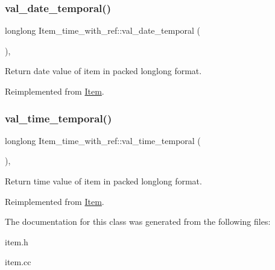 \subsubsection{\texorpdfstring{val\+\_\+date\+\_\+temporal()}{val\_date\_temporal()}}
{\footnotesize\ttfamily longlong Item\+\_\+time\+\_\+with\+\_\+ref\+::val\+\_\+date\+\_\+temporal (\begin{DoxyParamCaption}{ }\end{DoxyParamCaption})\hspace{0.3cm}{\ttfamily [inline]}, {\ttfamily [virtual]}}

Return date value of item in packed longlong format. 

Reimplemented from \mbox{\hyperlink{classItem_a9174217a46706eb2db74689b5365c4a5}{Item}}.

\mbox{\label{classItem__time__with__ref_a9e41e41a7136e706ac9182203ea3063f}} 
\subsubsection{\texorpdfstring{val\+\_\+time\+\_\+temporal()}{val\_time\_temporal()}}
{\footnotesize\ttfamily longlong Item\+\_\+time\+\_\+with\+\_\+ref\+::val\+\_\+time\+\_\+temporal (\begin{DoxyParamCaption}{ }\end{DoxyParamCaption})\hspace{0.3cm}{\ttfamily [inline]}, {\ttfamily [virtual]}}

Return time value of item in packed longlong format. 

Reimplemented from \mbox{\hyperlink{classItem_a69ef60a3917a1bb4832498a695754c58}{Item}}.



The documentation for this class was generated from the following files\+:\begin{DoxyCompactItemize}
\item 
item.\+h\item 
item.\+cc\end{DoxyCompactItemize}
